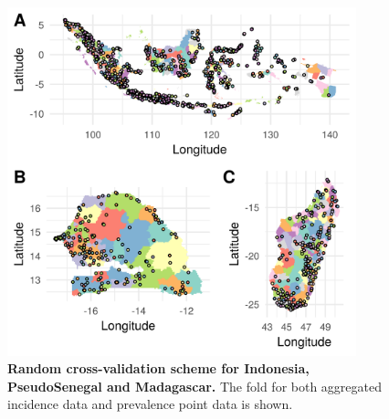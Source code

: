 \documentclass[10pt,letterpaper]{article}
\begin{document}

\begin{figure}[!h]
\centering

\includegraphics[width = 0.9\textwidth]{figures/random_crossvalidation_full.png} %

\caption{{\bf Random cross-validation scheme for Indonesia, PseudoSenegal and Madagascar.} The fold for both aggregated incidence data and prevalence point data is shown.}
\label{fig:cv_random}
\end{figure}
\end{document}
